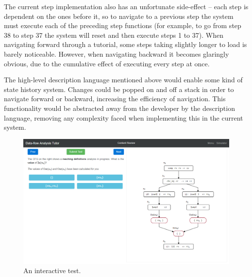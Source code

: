 \documentclass[bsc,twoside,singlespacing,parskip,logo,notimes,normalheadings]{infthesis}
\begin{document}
        The current step implementation also has an unfortunate
        side-effect -- each step is dependent on the ones before it,
        so to navigate to a previous step the system must execute each
        of the preceding step functions (for example, to go from step
        38 to step 37 the system will reset and then execute steps
        1 to 37). When navigating forward through a tutorial, some
        steps taking slightly longer to load is barely
        noticeable. However, when navigating backward it becomes
        glaringly obvious, due to the cumulative effect of executing
        every step at once.

        The high-level description language mentioned above would
        enable some kind of state history system. Changes could be
        popped on and off a stack in order to navigate forward or
        backward, increasing the efficiency of navigation. This
        functionality would be abstracted away from the developer by
        the description language, removing any complexity faced when
        implementing this in the current system.

        \begin{figure}[!b]
          \centering
          \includegraphics[width=\textwidth, trim=0 0 0 0]{img/test.png}
          \captionsetup{width=\textwidth, justification=centering}
          \caption{An interactive test.}\label{fig:testing}
          \vspace{-5mm}
        \end{figure}
\end{document}

